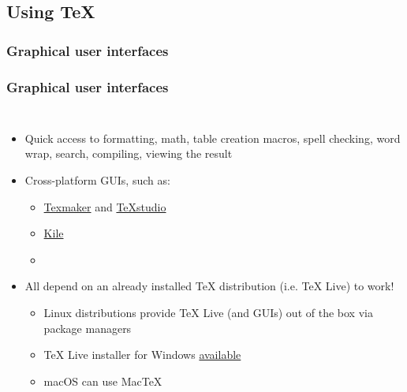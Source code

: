 \documentclass[xetex,colorlinks]{beamer} %
\begin{document}
  \subsection{Using \TeX{}}
  \subsubsection{Graphical user interfaces}
  \begin{frame}
    \frametitle{Graphical user interfaces}
    \begin{columns}
      \begin{itemize}
	\item Quick access to formatting, math, table creation macros, spell checking, word wrap, search, compiling, viewing the result
	\item Cross-platform GUIs, such as:
	\begin{itemize}
	  \item \href{http://www.xm1math.net/texmaker/}{Texmaker} and \href{http://www.texstudio.org/}{TeXstudio}
	  \item \href{http://kile.sourceforge.net/}{Kile}
	  \item \href{https://www.lyx.org/}{}
	\end{itemize}
	\item All depend on an already installed \TeX{} distribution (i.e. \TeX{} Live) to work!
	\begin{itemize}
	  \item Linux distributions provide \TeX{} Live (and GUIs) out of the box via package managers
	  \item \TeX{} Live installer for Windows \href{https://www.tug.org/texlive/acquire-netinstall.html}{available}
	  \item macOS can use Mac\TeX{}
	\end{itemize}
      \end{itemize}
      
    \end{columns}
  \end{frame}
  
\end{document}
